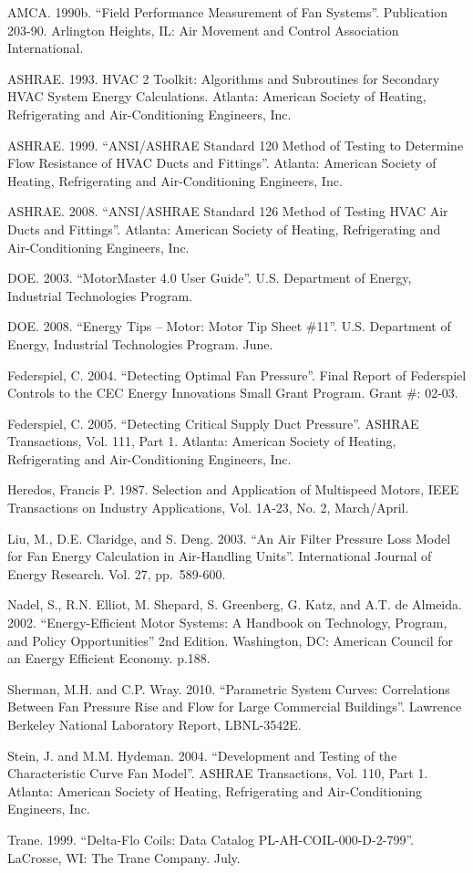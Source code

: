AMCA. 1990b. ``Field Performance Measurement of Fan Systems''. Publication 203-90. Arlington Heights, IL: Air Movement and Control Association International.

ASHRAE. 1993. HVAC 2 Toolkit: Algorithms and Subroutines for Secondary HVAC System Energy Calculations. Atlanta: American Society of Heating, Refrigerating and Air-Conditioning Engineers, Inc.

ASHRAE. 1999. ``ANSI/ASHRAE Standard 120 Method of Testing to Determine Flow Resistance of HVAC Ducts and Fittings''. Atlanta: American Society of Heating, Refrigerating and Air-Conditioning Engineers, Inc.

ASHRAE. 2008. ``ANSI/ASHRAE Standard 126 Method of Testing HVAC Air Ducts and Fittings''. Atlanta: American Society of Heating, Refrigerating and Air-Conditioning Engineers, Inc.

DOE. 2003. ``MotorMaster 4.0 User Guide''. U.S. Department of Energy, Industrial Technologies Program.

DOE. 2008. ``Energy Tips -- Motor: Motor Tip Sheet \#11''. U.S. Department of Energy, Industrial Technologies Program. June.

Federspiel, C. 2004. ``Detecting Optimal Fan Pressure''. Final Report of Federspiel Controls to the CEC Energy Innovations Small Grant Program. Grant \#: 02-03.

Federspiel, C. 2005. ``Detecting Critical Supply Duct Pressure''. ASHRAE Transactions, Vol. 111, Part 1. Atlanta: American Society of Heating, Refrigerating and Air-Conditioning Engineers, Inc.

Heredos, Francis P. 1987. Selection and Application of Multispeed Motors, IEEE Transactions on Industry Applications, Vol. 1A-23, No. 2, March/April.

Liu, M., D.E. Claridge, and S. Deng. 2003. ``An Air Filter Pressure Loss Model for Fan Energy Calculation in Air-Handling Units''. International Journal of Energy Research. Vol. 27, pp.~589-600.

Nadel, S., R.N. Elliot, M. Shepard, S. Greenberg, G. Katz, and A.T. de Almeida. 2002. ``Energy-Efficient Motor Systems: A Handbook on Technology, Program, and Policy Opportunities'' 2nd Edition. Washington, DC: American Council for an Energy Efficient Economy. p.188.

Sherman, M.H. and C.P. Wray. 2010. ``Parametric System Curves: Correlations Between Fan Pressure Rise and Flow for Large Commercial Buildings''. Lawrence Berkeley National Laboratory Report, LBNL-3542E.

Stein, J. and M.M. Hydeman. 2004. ``Development and Testing of the Characteristic Curve Fan Model''. ASHRAE Transactions, Vol. 110, Part 1. Atlanta: American Society of Heating, Refrigerating and Air-Conditioning Engineers, Inc.

Trane. 1999. ``Delta-Flo Coils: Data Catalog PL-AH-COIL-000-D-2-799''. LaCrosse, WI: The Trane Company. July.
